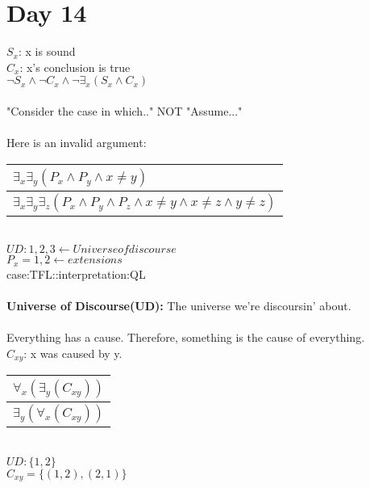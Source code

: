\documentclass{article}
\begin{document}
	\section{Day 14}
	$S_x$: x is sound\\
	$C_x$: x's conclusion is true\\
	$\lnot S_x \land \lnot C_x \land \lnot \exists _x(S_x \land C_x)$\\
	\\
	"Consider the case in which.." NOT "Assume..."\\
	\\
	Here is an invalid argument:\\
	\begin{tabular}{l}
		$\exists _x \exists _y (P_x \land P_y \land x \neq y)$\\\hline
		$\exists _x \exists _y \exists _z (P_x \land P_y \land P_z \land x \neq y \land x \neq z \land y \neq z)$
	\end{tabular}\\
	$UD: 1,2,3 \leftarrow Universe of discourse$\\
	$P_x = 1,2 \leftarrow extensions$\\
	case:TFL::interpretation:QL\\
	\\
	\textbf{Universe of Discourse(UD):} The universe we're discoursin' about.\\
	\\
	Everything has a cause. Therefore, something is the cause of everything.\\
	$C_{xy}$: x was caused by y.\\
	\begin{tabular}{l}
		$\forall _x ( \exists _y(C_{xy}))$\\\hline
		$\exists _y ( \forall _x(C_{xy}))$
	\end{tabular}\\
	$UD: \{ 1, 2 \} $\\
	$C_{xy} = \{ (1,2), (2,1) \}$\\
\end{document}
